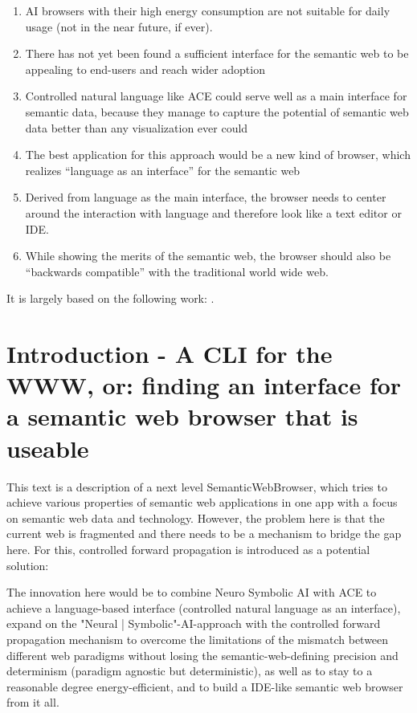 \documentclass[12pt,a4paper]{article}
\begin{document}
\begin{enumerate}
    \item AI browsers with their high energy consumption are not suitable for daily usage (not in the near future, if ever).
    \item There has not yet been found a sufficient interface for the semantic web to be appealing to end-users and reach wider adoption
    \item Controlled natural language like ACE could serve well as a main interface for semantic data, because they manage to capture the potential of semantic web data better than any visualization ever could
    \item The best application for this approach would be a new kind of browser, which realizes ``language as an interface'' for the semantic web
    \item Derived from language as the main interface, the browser needs to center around the interaction with language and therefore look like a text editor or IDE.
    \item While showing the merits of the semantic web, the browser should also be ``backwards compatible'' with the traditional world wide web.
\end{enumerate}

It is largely based on the following work: \cite{semanticWebAce}.

\section{Introduction - A CLI for the WWW, or: finding an interface for a semantic web browser that is useable}

This text is a description of a next level SemanticWebBrowser, which tries to achieve various properties of semantic web applications in one app with a focus on semantic web data and technology. However, the problem here is that the current web is fragmented and there needs to be a mechanism to bridge the gap here. For this, controlled forward propagation is introduced as a potential solution:

The innovation here would be to combine Neuro Symbolic AI with ACE to achieve a language-based interface (controlled natural language as an interface), expand on the "Neural | Symbolic"-AI-approach with the controlled forward propagation mechanism to overcome the limitations of the mismatch between different web paradigms without losing the semantic-web-defining precision and determinism (paradigm agnostic but deterministic), as well as to stay to a reasonable degree energy-efficient, and to build a IDE-like semantic web browser from it all.
\end{document}
